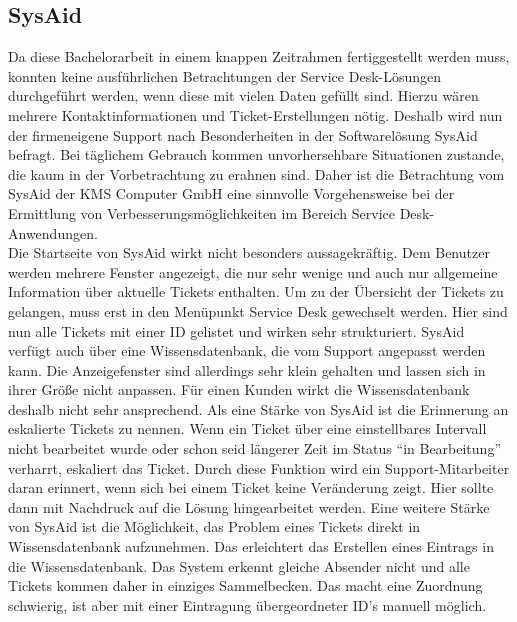 \subsection{SysAid}
\noindent
Da diese Bachelorarbeit in einem knappen Zeitrahmen fertiggestellt werden muss, konnten keine ausführlichen Betrachtungen der Service Desk-Lösungen durchgeführt werden, wenn diese mit vielen Daten gefüllt sind. Hierzu wären mehrere Kontaktinformationen und Ticket-Erstellungen nötig. Deshalb wird nun der firmeneigene Support nach Besonderheiten in der Softwarelösung SysAid befragt. Bei täglichem Gebrauch kommen unvorhersehbare Situationen zustande, die kaum in der Vorbetrachtung zu erahnen sind. Daher ist die Betrachtung vom SysAid der KMS Computer GmbH eine sinnvolle Vorgehensweise bei der Ermittlung von Verbesserungsmöglichkeiten im Bereich Service Desk-Anwendungen.\\
\noindent
Die Startseite von SysAid wirkt nicht besonders aussagekräftig. Dem Benutzer werden mehrere Fenster angezeigt, die nur sehr wenige und auch nur allgemeine Information über aktuelle Tickets enthalten. Um zu der Übersicht der Tickets zu gelangen, muss erst in den Menüpunkt Service Desk gewechselt werden. Hier sind nun alle Tickets mit einer ID gelistet und wirken sehr strukturiert. \newline
SysAid verfügt auch über eine Wissensdatenbank, die vom Support angepasst werden kann. Die Anzeigefenster sind allerdings sehr klein gehalten und lassen sich in ihrer Größe nicht anpassen. Für einen Kunden wirkt die Wissensdatenbank deshalb nicht sehr ansprechend.\newline
Als eine Stärke von SysAid ist die Erinnerung an eskalierte Tickets zu nennen. Wenn ein Ticket über eine einstellbares Intervall  nicht bearbeitet wurde oder schon seid längerer Zeit im Status \enquote{in Bearbeitung} verharrt, eskaliert das Ticket.\newline
Durch diese Funktion wird ein Support-Mitarbeiter daran erinnert, wenn sich bei einem Ticket keine Veränderung zeigt. Hier sollte dann mit Nachdruck auf die Lösung hingearbeitet werden. Eine weitere Stärke von SysAid ist die Möglichkeit, das Problem eines Tickets direkt in Wissensdatenbank aufzunehmen. Das erleichtert das Erstellen eines Eintrags in die Wissensdatenbank. \newline
Das System erkennt  gleiche Absender nicht und alle Tickets kommen daher in einziges Sammelbecken. Das macht eine Zuordnung schwierig, ist aber mit einer Eintragung übergeordneter ID's manuell möglich.\newline
